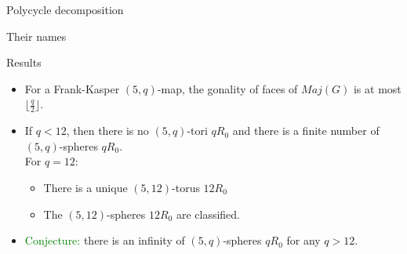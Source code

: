 \documentclass[%
pdf,
colorBG,
slideColor,
]{prosper}
\begin{document}
{\begin{slide}{Polycycle decomposition}
{\begin{center}
\begin{minipage}{8.4cm}
Their names
\end{minipage}
\end{center}
}

\end{slide}
}


\begin{slide}{Results}
\begin{itemize}
\item For a Frank-Kasper $(5,q)$-map, the gonality of faces of $Maj(G)$ is at most $\lfloor \frac{q}{2}\rfloor$.
\item If $q<12$, then there is no $(5,q)$-tori $qR_0$ and there is a finite number of $(5,q)$-spheres $qR_0$.\\
For $q=12$:

\begin{minipage}{5.2cm}
\begin{itemize}
\item There is a unique $(5,12)$-torus $12R_0$
\item The $(5,12)$-spheres $12R_0$ are classified.
\end{itemize}
\vspace{0.7cm}
\end{minipage}
\begin{minipage}{5.2cm}
\centering
{}\par
\end{minipage}
\item \textcolor{green}{Conjecture:} there is an infinity of $(5,q)$-spheres $qR_0$ for any $q>12$.
\end{itemize}
\end{slide}
\end{document}
